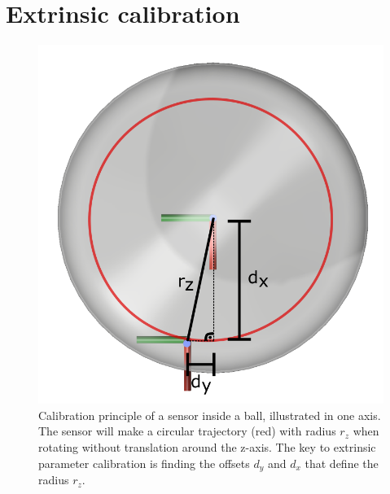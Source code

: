 \section{Extrinsic calibration}

\begin{figure}
  \centering
  \includegraphics[width=.7\linewidth]{img/calibsphere}
  \caption{Calibration principle of a sensor inside a ball, illustrated in one axis.
  The sensor will make a circular trajectory (red) with radius $r_z$ when rotating without translation around the z-axis.
  The key to extrinsic parameter calibration is finding the offsets $d_y$ and $d_x$ that define the radius $r_z$.}
  \label{fig:calibsphere}
\end{figure}

